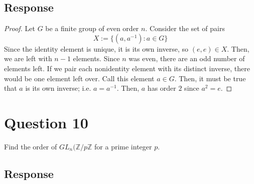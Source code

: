 \documentclass[13pt]{article}
\begin{document}
\subsection*{Response}
\begin{proof}
    Let $G$ be a finite group of even order $n$. Consider the set of pairs 
    \[X := \{ (a, a^{-1}) : a \in G \}\]
    Since the identity element is unique, it is its own inverse, so $(e, e) \in X$. Then, 
    we are left with $n - 1$ elements. Since $n$ was even, there are an odd number of elements left. 
    If we pair each nonidentity element with its distinct inverse, there would be one element left 
    over. Call this element $a \in G$. Then, it must be true that $a$ is its own inverse; i.e. 
    $a = a^{-1}$. Then, $a$ has order $2$ since $a^2 = e$.
\end{proof}




\newpage
\section*{Question 10}
Find the order of $GL_n(\mathbb{Z}/p\mathbb{Z}$ for a prime integer $p$.

\subsection*{Response}
\end{document}
